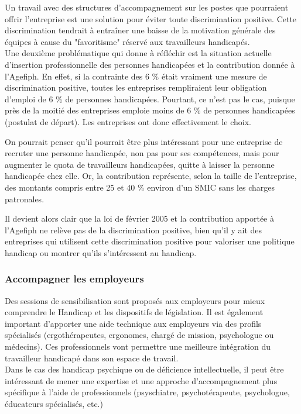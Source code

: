 Un travail avec des structures d'accompagnement sur les postes que pourraient offrir l'entreprise est une solution pour éviter toute discrimination positive. Cette discrimination tendrait à entraîner une baisse de la motivation générale des équipes à cause du "favoritisme" réservé aux travailleurs handicapés.\\

Une deuxième problématique qui donne à réfléchir est la situation actuelle d'insertion professionnelle des personnes handicapées et la contribution donnée à l'Agefiph. En effet, si la contrainte des 6 \% était vraiment une mesure de discrimination positive, toutes les entreprises rempliraient leur obligation d'emploi de 6 \% de personnes handicapées. Pourtant, ce n'est pas le cas, puisque près de la moitié des entreprises emploie moins de 6 \% de personnes handicapées (postulat de départ). Les entreprises ont donc effectivement le choix.

On pourrait penser qu'il pourrait être plus intéressant pour une entreprise de recruter une personne handicapée, non pas pour ses compétences, mais pour augmenter le quota de travailleurs handicapées, quitte à laisser la personne handicapée chez elle. Or, la contribution représente, selon la taille de l'entreprise, des montants compris entre 25 et 40 \% environ d'un SMIC sans les charges patronales.

Il devient alors clair que la loi de février 2005 et la contribution apportée à l'Agefiph ne relève pas de la discrimination positive, bien qu'il y ait des entreprises qui utilisent cette discrimination positive pour valoriser une politique handicap ou montrer qu'ils s'intéressent au handicap.

\subsubsection{Accompagner les employeurs}
Des sessions de sensibilisation sont proposés aux employeurs pour mieux comprendre le Handicap et les dispositifs de législation. Il est également important d'apporter une aide technique aux employeurs via des profils spécialisés (ergothérapeutes, ergonomes, chargé de mission, psychologue ou médecins). Ces professionnels vont permettre une meilleure intégration du travailleur handicapé dans son espace de travail.\\

Dans le cas des handicap psychique ou de déficience intellectuelle, il peut être intéressant de mener une expertise et une approche d'accompagnement plus spécifique à l'aide de professionnels (psyschiatre, psychotérapeute, psychologue, éducateurs spécialisés, etc.)

